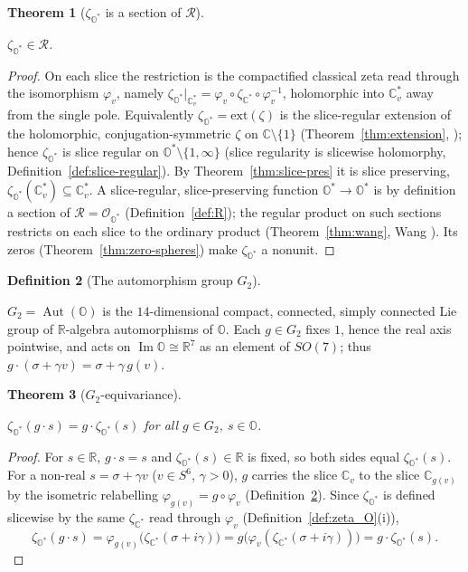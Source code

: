 \documentclass[11pt]{article}
\newcommand{\OO}{\mathbb{O}}
\newcommand{\CC}{\mathbb{C}}
\newcommand{\RR}{\mathbb{R}}
\newcommand{\Ostar}{\OO^{*}}
\newcommand{\Cstar}{\CC^{*}}
\newcommand{\zetaO}{\zeta_{\Ostar}}
\newcommand{\zetaC}{\zeta_{\Cstar}}
\DeclareMathOperator{\Aut}{Aut}
\DeclareMathOperator{\im}{Im}
\providecommand{\Gtwo}{G_2}
\providecommand{\lean}[1]{}
\providecommand{\uses}[1]{}
\theoremstyle{plain}
\newtheorem{theorem}{Theorem}[section]
\theoremstyle{definition}
\newtheorem{definition}[theorem]{Definition}
\theoremstyle{remark}
\begin{document}
\begin{theorem}[$\zetaO$ is a section of $\mathcal R$]\label{thm:zeta-in-R}
\lean{zetaSection}
\uses{thm:slice-pres, thm:extension, def:R, prop:well-defined}
$\zetaO\in\mathcal R$.
\end{theorem}
\begin{proof}
On each slice the restriction is the compactified classical zeta read through the
isomorphism $\varphi_v$, namely $\zetaO|_{\CC_v^{*}}=\varphi_v\circ\zetaC\circ\varphi_v^{-1}$,
holomorphic into $\CC_v^{*}$ away from the single pole.
Equivalently $\zetaO=\mathrm{ext}(\zeta)$ is the slice-regular extension of the
holomorphic, conjugation-symmetric $\zeta$ on $\CC\setminus\{1\}$
(Theorem~\ref{thm:extension}, \cite[Thm.~5.1.5]{CSS12}); hence $\zetaO$ is slice regular
on $\Ostar\setminus\{1,\infty\}$ (slice regularity is slicewise holomorphy,
Definition~\ref{def:slice-regular}). By Theorem~\ref{thm:slice-pres} it is slice
preserving, $\zetaO(\CC_v^{*})\subseteq\CC_v^{*}$. A slice-regular, slice-preserving
function $\Ostar\to\Ostar$ is by definition a section of $\mathcal R=\mathcal O_{\Ostar}$
(Definition~\ref{def:R}); the regular product on such sections restricts on each slice to
the ordinary product (Theorem~\ref{thm:wang}, Wang \cite[Rem.~2.11]{Wang}). Its zeros
\textup{(}Theorem~\ref{thm:zero-spheres}\textup{)} make $\zetaO$ a nonunit.
\end{proof}

\begin{definition}[The automorphism group $\Gtwo$]\label{def:G2}
\lean{G2, G2.smul_one, G2.smul_ofReal}
$\Gtwo=\Aut(\OO)$ is the $14$-dimensional compact, connected, simply connected Lie group of
$\RR$-algebra automorphisms of $\OO$. Each $g\in\Gtwo$ fixes $1$, hence the real axis pointwise, and
acts on $\im\OO\cong\RR^7$ as an element of $SO(7)$; thus $g\cdot(\sigma+\gamma v)=\sigma+\gamma\,g(v)$.
\end{definition}

\begin{theorem}[$\Gtwo$-equivariance]\label{thm:G2-equiv}
\lean{zetaO_equivariant}
\uses{def:G2, def:zeta_O}
$\zetaO(g\cdot s)=g\cdot\zetaO(s)$ for all $g\in\Gtwo$, $s\in\OO$.
\end{theorem}
\begin{proof}
For $s\in\RR$, $g\cdot s=s$ and $\zetaO(s)\in\RR$ is fixed, so both sides equal $\zetaO(s)$. For a
non-real $s=\sigma+\gamma v$ ($v\in S^6$, $\gamma>0$), $g$ carries the slice $\CC_v$ to the slice
$\CC_{g(v)}$ by the isometric relabelling $\varphi_{g(v)}=g\circ\varphi_v$
(Definition~\ref{def:G2}). Since $\zetaO$ is defined slicewise by the same $\zetaC$ read through
$\varphi_v$ (Definition~\ref{def:zeta_O}(i)),
\[
  \zetaO(g\cdot s)=\varphi_{g(v)}\bigl(\zetaC(\sigma+i\gamma)\bigr)
                 =g\bigl(\varphi_{v}(\zetaC(\sigma+i\gamma))\bigr)=g\cdot\zetaO(s).
\]
\end{proof}
\end{document}
